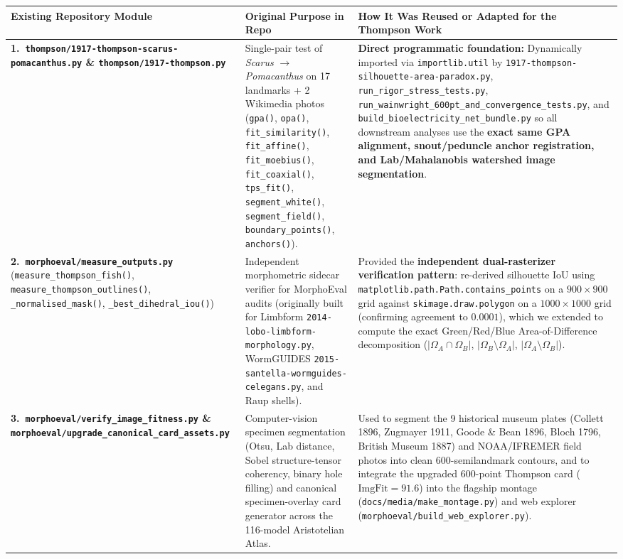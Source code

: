 \documentclass[10.5pt,a4paper]{article}
\newcommand{\code}[1]{{\footnotesize\nolinkurl{#1}}}
\begin{document}
\vspace{0.3em}
{\small
\renewcommand{\arraystretch}{1.26}
\begin{tabularx}{\textwidth}{L{1.5in} L{1.55in} Y}
\toprule
\textbf{Existing Repository Module} & \textbf{Original Purpose in Repo} & \textbf{How It Was Reused or Adapted for the Thompson Work} \\
\midrule
\textbf{1.\ \code{thompson/1917-thompson-scarus-pomacanthus.py} \& \code{thompson/1917-thompson.py}} &
Single-pair test of \emph{Scarus} $\to$ \emph{Pomacanthus} on 17 landmarks + 2 Wikimedia photos (\code{gpa()}, \code{opa()}, \code{fit_similarity()}, \code{fit_affine()}, \code{fit_moebius()}, \code{fit_coaxial()}, \code{tps_fit()}, \code{segment_white()}, \code{segment_field()}, \code{boundary_points()}, \code{anchors()}). &
\textbf{Direct programmatic foundation:} Dynamically imported via \code{importlib.util} by \code{1917-thompson-silhouette-area-paradox.py}, \code{run_rigor_stress_tests.py}, \code{run_wainwright_600pt_and_convergence_tests.py}, and \code{build_bioelectricity_net_bundle.py} so all downstream analyses use the \textbf{exact same GPA alignment, snout/peduncle anchor registration, and Lab/Mahalanobis watershed image segmentation}. \\
\midrule
\textbf{2.\ \code{morphoeval/measure_outputs.py}} (\code{measure_thompson_fish()}, \code{measure_thompson_outlines()}, \code{_normalised_mask()}, \code{_best_dihedral_iou()}) &
Independent morphometric sidecar verifier for MorphoEval audits (originally built for Limbform \code{2014-lobo-limbform-morphology.py}, WormGUIDES \code{2015-santella-wormguides-celegans.py}, and Raup shells). &
Provided the \textbf{independent dual-rasterizer verification pattern}: re-derived silhouette $\mathrm{IoU}$ using \code{matplotlib.path.Path.contains_points} on a $900 \times 900$ grid against \code{skimage.draw.polygon} on a $1000 \times 1000$ grid (confirming agreement to $0.0001$), which we extended to compute the exact Green/Red/Blue Area-of-Difference decomposition ($|\Omega_A \cap \Omega_B|$, $|\Omega_B \setminus \Omega_A|$, $|\Omega_A \setminus \Omega_B|$). \\
\midrule
\textbf{3.\ \code{morphoeval/verify_image_fitness.py} \& \code{morphoeval/upgrade_canonical_card_assets.py}} &
Computer-vision specimen segmentation (Otsu, Lab distance, Sobel structure-tensor coherency, binary hole filling) and canonical specimen-overlay card generator across the 116-model Aristotelian Atlas. &
Used to segment the 9 historical museum plates (Collett 1896, Zugmayer 1911, Goode \& Bean 1896, Bloch 1796, British Museum 1887) and NOAA/IFREMER field photos into clean 600-semilandmark contours, and to integrate the upgraded 600-point Thompson card ($\mathrm{ImgFit} = 91.6$) into the flagship montage (\code{docs/media/make_montage.py}) and web explorer (\code{morphoeval/build_web_explorer.py}). \\

\end{tabularx}}
\end{document}
